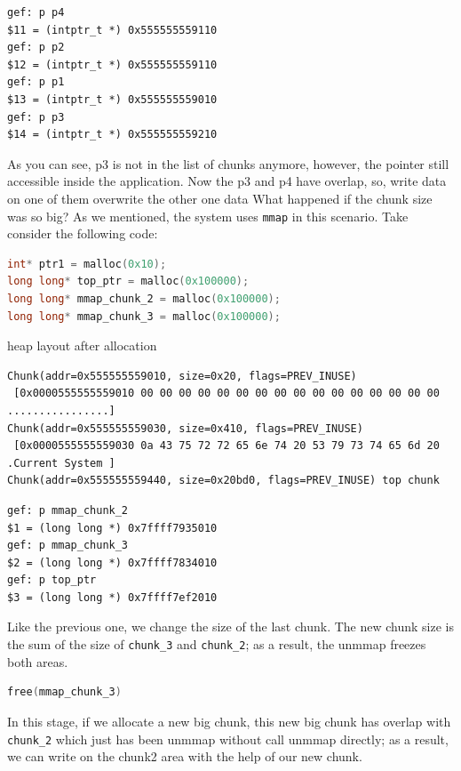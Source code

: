 \documentclass{masterthesis}
\newcommand*\mmapc{\lstinline{mmap}}
\begin{document}
\begin{lstlisting}[frame=tlrb]
gef: p p4
$11 = (intptr_t *) 0x555555559110
gef: p p2
$12 = (intptr_t *) 0x555555559110
gef: p p1
$13 = (intptr_t *) 0x555555559010
gef: p p3
$14 = (intptr_t *) 0x555555559210
 \end{lstlisting}

As you can see, p3 is not in the list of chunks anymore, however, the pointer still accessible inside the application. Now the p3 and p4 have overlap, so, write data on one of them overwrite the other one data
What happened if the chunk size was so big? As we mentioned, the system uses \mmapc{} in this scenario. Take consider the following code:

\begin{lstlisting}[language=c,frame=tlrb]
int* ptr1 = malloc(0x10);
long long* top_ptr = malloc(0x100000);
long long* mmap_chunk_2 = malloc(0x100000);
long long* mmap_chunk_3 = malloc(0x100000);
 \end{lstlisting}

heap layout after allocation

\begin{lstlisting}[frame=tlrb]
Chunk(addr=0x555555559010, size=0x20, flags=PREV_INUSE)
 [0x0000555555559010 00 00 00 00 00 00 00 00 00 00 00 00 00 00 00 00 ................]
Chunk(addr=0x555555559030, size=0x410, flags=PREV_INUSE)
 [0x0000555555559030 0a 43 75 72 72 65 6e 74 20 53 79 73 74 65 6d 20 .Current System ]
Chunk(addr=0x555555559440, size=0x20bd0, flags=PREV_INUSE) top chunk
 \end{lstlisting}

\begin{lstlisting}[frame=tlrb]
gef: p mmap_chunk_2
$1 = (long long *) 0x7ffff7935010
gef: p mmap_chunk_3
$2 = (long long *) 0x7ffff7834010
gef: p top_ptr
$3 = (long long *) 0x7ffff7ef2010
 \end{lstlisting}

Like the previous one, we change the size of the last chunk. The new chunk size is the sum of the size of \lstinline{chunk_3} and \lstinline{chunk_2}; as a result, the unmmap freezes both areas.

\begin{lstlisting}[language=c,frame=tlrb]
free(mmap_chunk_3)
 \end{lstlisting}

In this stage, if we allocate a new big chunk, this new big chunk has overlap with \lstinline{chunk_2} which just has been unmmap without call unmmap directly; as a result, we can write on the chunk2 area with the help of our new chunk.
\end{document}
